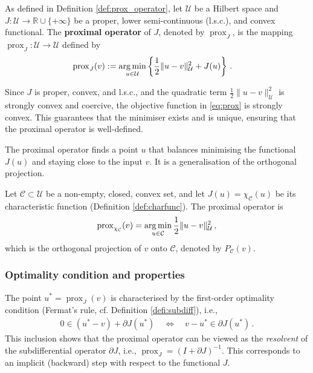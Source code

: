 \begin{defi}\label{def:prox_operator_recap}\normalfont
As defined in Definition \ref{def:prox_operator}, let $\mathcal{U}$ be a Hilbert space and $J \colon \mathcal{U} \to \mathbb{R} \cup \{+\infty\}$ be a proper, lower semi-continuous (l.s.c.), and convex functional. The \textbf{proximal operator} of $J$, denoted by $\operatorname{prox}_{J}$, is the mapping $\operatorname{prox}_{J} \colon \mathcal{U} \to \mathcal{U}$ defined by
\begin{align*}
\operatorname{prox}_{J}(v) &:= \operatorname*{arg\,min}_{u \in \mathcal{U}} \left\{ \frac12 \|u - v\|_{\mathcal{U}}^2 + J(u) \right\} \, .
\end{align*}
\end{defi}

\noindent Since $J$ is proper, convex, and l.s.c., and the quadratic term $\frac12 \|u - v\|_{\mathcal{U}}^2$ is strongly convex and coercive, the objective function in \eqref{eq:prox} is strongly convex. This guarantees that the minimiser exists and is unique, ensuring that the proximal operator is well-defined.

The proximal operator finds a point $u$ that balances minimising the functional $J(u)$ and staying close to the input $v$. It is a generalisation of the orthogonal projection.

\begin{exm}[Projection]\normalfont
Let $\mathcal{C} \subset \mathcal{U}$ be a non-empty, closed, convex set, and let $J(u) = \chi_{\mathcal{C}}(u)$ be its characteristic function (Definition \ref{def:charfunc}). The proximal operator is
\begin{align*}
\operatorname{prox}_{\chi_{\mathcal{C}}}(v) = \operatorname*{arg\,min}_{u \in \mathcal{C}} \frac12 \|u - v\|_{\mathcal{U}}^2 \, ,
\end{align*}
which is the orthogonal projection of $v$ onto $\mathcal{C}$, denoted by $P_{\mathcal{C}}(v)$.
\end{exm}

\subsubsection{Optimality condition and properties}
The point $u^* = \operatorname{prox}_{J}(v)$ is characterised by the first-order optimality condition (Fermat's rule, cf. Definition \ref{defi:subdiff}), i.e.,
\begin{align}
0 \in (u^* - v) + \partial J(u^*) \quad \iff \quad v - u^* \in \partial J(u^*) \, . \label{eq:prox_inclusion}
\end{align}
This inclusion shows that the proximal operator can be viewed as the \emph{resolvent} of the subdifferential operator $\partial J$, i.e., $\operatorname{prox}_{J} = (I + \partial J)^{-1}$. This corresponds to an implicit (backward) step with respect to the functional $J$.

